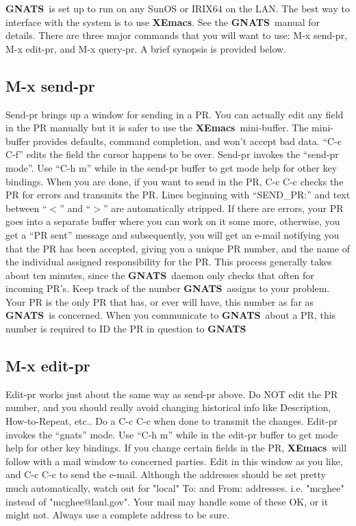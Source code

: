 \documentclass[11pt]{nmemo}
\newcommand{\xemacs}{{\normalfont\bfseries XEmacs}}
\newcommand{\gnats}{{\normalfont\bfseries GNATS}}
\begin{document}
\gnats\ is set up to run on any SunOS or IRIX64 on the LAN.
The best way to interface with the system is to
use \xemacs. See the \gnats\ manual for details.
 There are three major commands that you will want to use:
M-x send-pr, M-x edit-pr, and M-x query-pr. A brief synopsis
is provided below.

\subsection{M-x send-pr }
Send-pr brings up a window for sending in a PR. You can actually 
edit any field in the PR manually but it is safer to use the \xemacs\ mini-buffer.
The mini-buffer provides defaults, command completion, and won't accept bad
data. ``C-c C-f'' edits the field the cursor happens to be over.
Send-pr invokes the ``send-pr mode''.
Use ``C-h m'' while in the send-pr buffer to get mode help for 
other key bindings.
When you are done, if
you want to send in the PR, C-c C-c checks the
PR for errors and transmits the PR. Lines beginning with
``SEND\_PR:'' and text between ``$<$'' and ``$>$'' are automatically stripped.
If there are errors, your PR
goes into a separate buffer where you can work on it some more,
otherwise, you get a ``PR sent'' message and subsequently,
you will get an e-mail notifying you that the PR has been accepted,
giving you a unique PR number, and the name of the individual assigned
responsibility for the PR.  This process generally takes about
ten  minutes, since the \gnats\ daemon
only checks that often for incoming PR's.
Keep track of the number \gnats\ assigns to
your problem. Your PR is the only PR that has, or ever will
have, this number as far as \gnats\ is concerned. When you communicate
to \gnats\ about a PR, this number is required to ID the PR in question
to \gnats\.

\subsection{M-x edit-pr }
Edit-pr works just about the same way as send-pr above. Do NOT edit
the PR number, and you should really avoid changing historical info
like Description, How-to-Repeat, etc.. Do a C-c C-c when done to
transmit the changes. Edit-pr invokes the ``gnats'' mode.
Use ``C-h m'' while in the edit-pr buffer 
to get mode help for other key bindings.
If you change certain fields in the PR, \xemacs\ will follow
with a mail window to concerned parties. Edit in this window as you
like, and C-c C-c to send the e-mail. Although the addresses should
be set pretty much automatically, watch out for "local"  To:
and From: addresses. i.e.
"mcghee" instead of "mcghee@lanl.gov". Your mail may handle some of
these OK, or it might not. Always use a complete address to be sure.
\end{document}
